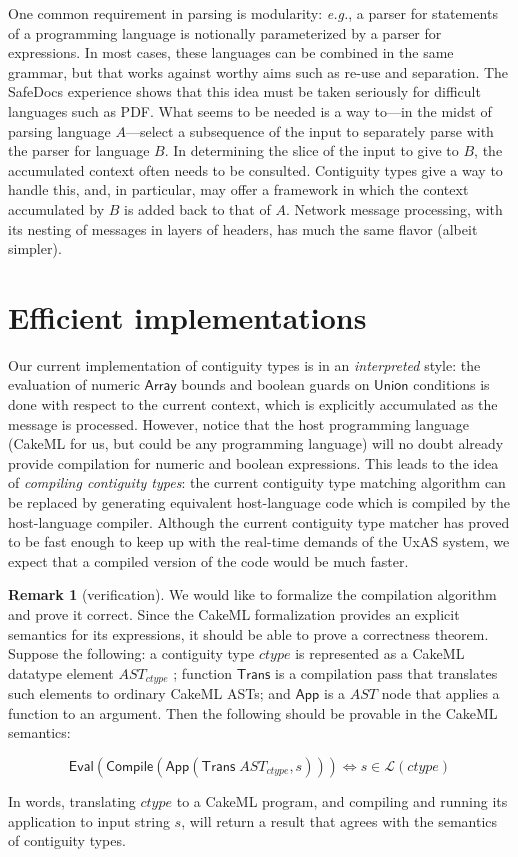 \documentclass{article}
\newcommand{\eg}{\textit{e.g.}}
\newcommand{\konst}[1]{\ensuremath{\mathsf{#1}}}
\newcommand{\Lang}[1]{\ensuremath{{\mathcal L}({#1})}}
\theoremstyle{definition}
\newtheorem*{remark}{Remark}
\begin{document}
 One common requirement in parsing is modularity: \eg, a parser for
 statements of a programming language is notionally parameterized by a
 parser for expressions. In most cases, these languages can be
 combined in the same grammar, but that works against worthy aims such
 as re-use and separation. The SafeDocs experience shows that this
 idea must be taken seriously for difficult languages such as
 PDF. What seems to be needed is a way to---in the midst of parsing
 language $A$---select a subsequence of the input to separately parse
 with the parser for language $B$. In determining the slice of the
 input to give to $B$, the accumulated context often needs to be
 consulted. Contiguity types give a way to handle this, and, in
 particular, may offer a framework in which the context accumulated by
 $B$ is added back to that of $A$. Network message processing, with
 its nesting of messages in layers of headers, has much the same
 flavor (albeit simpler).

\section{Efficient implementations}

Our current implementation of contiguity types is in an
\emph{interpreted} style: the evaluation of numeric \konst{Array}
bounds and boolean guards on \konst{Union} conditions is done with
respect to the current context, which is explicitly accumulated as the
message is processed. However, notice that the host programming
language (CakeML for us, but could be any programming language) will
no doubt already provide compilation for numeric and boolean
expressions. This leads to the idea of \emph{compiling contiguity
  types}: the current contiguity type matching algorithm can be
replaced by generating equivalent host-language code which is compiled
by the host-language compiler. Although the current contiguity type
matcher has proved to be fast enough to keep up with the real-time
demands of the UxAS system, we expect that a compiled version of the
code would be much faster.

\begin{remark} [verification] We would like to formalize the compilation
algorithm and prove it correct. Since the CakeML formalization
provides an explicit semantics for its expressions, it should be able
to prove a correctness theorem. Suppose the following: a contiguity type
$\mathit{ctype}$ is represented as a CakeML datatype element
$\mathit{AST}_{\mathit{ctype}}$ ; function $\konst{Trans}$ is a
compilation pass that translates such elements to ordinary CakeML ASTs;
and \konst{App} is a $\mathit{AST}$ node that applies a function to an
argument. Then the following should be provable in the CakeML semantics:

\[
 \konst{Eval}(\konst{Compile} (\konst{App}(\konst{Trans}\; \mathit{AST}_\mathit{ctype},s))) \iff s \in \Lang{\mathit{ctype}}
\]

In words, translating $\mathit{ctype}$ to a CakeML program, and
compiling and running its application to input string $s$, will
return a result that agrees with the semantics of contiguity types.

\end{remark}
\end{document}

